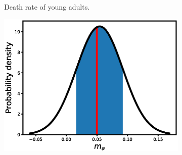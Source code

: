 \documentclass[12pt, table]{article}
\begin{document}
\begin{figure}[H]
\begin{subfigure}[b]{0.45\textwidth}
        \caption{Death rate of  young adults.}
       \label{fig2e}
   \end{subfigure}
   \begin{subfigure}[b]{0.45\textwidth}
       \includegraphics[width=1\textwidth, height=0.24\textheight]{figexple2/fma}
      

\end{subfigure}
\end{figure}
\end{document}

